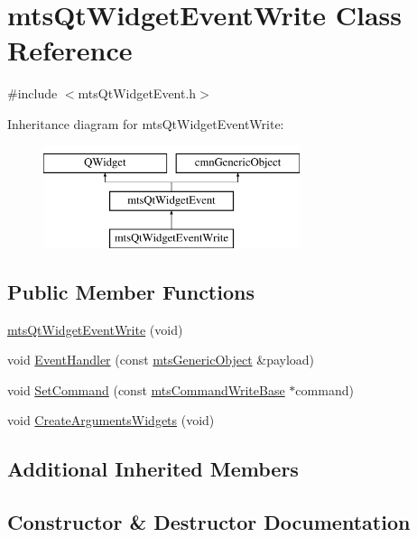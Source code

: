 \hypertarget{classmts_qt_widget_event_write}{}\section{mts\+Qt\+Widget\+Event\+Write Class Reference}
\label{classmts_qt_widget_event_write}


{\ttfamily \#include $<$mts\+Qt\+Widget\+Event.\+h$>$}

Inheritance diagram for mts\+Qt\+Widget\+Event\+Write\+:\begin{figure}[H]
\begin{center}
\leavevmode
\includegraphics[height=3.000000cm]{d9/d41/classmts_qt_widget_event_write}
\end{center}
\end{figure}
\subsection*{Public Member Functions}
\begin{DoxyCompactItemize}
\item 
\hyperlink{classmts_qt_widget_event_write_afd9af040e15dd686f4ff7657b0232586}{mts\+Qt\+Widget\+Event\+Write} (void)
\item 
void \hyperlink{classmts_qt_widget_event_write_a4fd99e17b7f4d9f87e25a5e6f9333712}{Event\+Handler} (const \hyperlink{classmts_generic_object}{mts\+Generic\+Object} \&payload)
\item 
void \hyperlink{classmts_qt_widget_event_write_a7a112b0fd30ffd94b5ef1df2ccb1484e}{Set\+Command} (const \hyperlink{classmts_command_write_base}{mts\+Command\+Write\+Base} $\ast$command)
\item 
void \hyperlink{classmts_qt_widget_event_write_af352ea320acc8ae8cb8ec514dc934d1a}{Create\+Arguments\+Widgets} (void)
\end{DoxyCompactItemize}
\subsection*{Additional Inherited Members}


\subsection{Constructor \& Destructor Documentation}
\hypertarget{classmts_qt_widget_event_write_afd9af040e15dd686f4ff7657b0232586}{}
